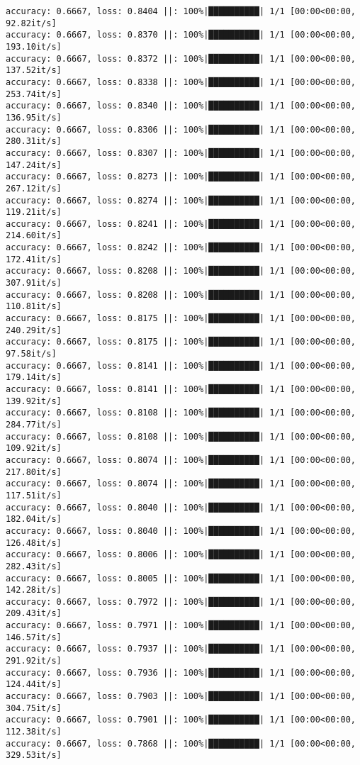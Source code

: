 \documentclass[
]{article}
\begin{document}
\begin{verbatim}
accuracy: 0.6667, loss: 0.8404 ||: 100%|██████████| 1/1 [00:00<00:00, 92.82it/s]
accuracy: 0.6667, loss: 0.8370 ||: 100%|██████████| 1/1 [00:00<00:00, 193.10it/s]
accuracy: 0.6667, loss: 0.8372 ||: 100%|██████████| 1/1 [00:00<00:00, 137.52it/s]
accuracy: 0.6667, loss: 0.8338 ||: 100%|██████████| 1/1 [00:00<00:00, 253.74it/s]
accuracy: 0.6667, loss: 0.8340 ||: 100%|██████████| 1/1 [00:00<00:00, 136.95it/s]
accuracy: 0.6667, loss: 0.8306 ||: 100%|██████████| 1/1 [00:00<00:00, 280.31it/s]
accuracy: 0.6667, loss: 0.8307 ||: 100%|██████████| 1/1 [00:00<00:00, 147.24it/s]
accuracy: 0.6667, loss: 0.8273 ||: 100%|██████████| 1/1 [00:00<00:00, 267.12it/s]
accuracy: 0.6667, loss: 0.8274 ||: 100%|██████████| 1/1 [00:00<00:00, 119.21it/s]
accuracy: 0.6667, loss: 0.8241 ||: 100%|██████████| 1/1 [00:00<00:00, 214.60it/s]
accuracy: 0.6667, loss: 0.8242 ||: 100%|██████████| 1/1 [00:00<00:00, 172.41it/s]
accuracy: 0.6667, loss: 0.8208 ||: 100%|██████████| 1/1 [00:00<00:00, 307.91it/s]
accuracy: 0.6667, loss: 0.8208 ||: 100%|██████████| 1/1 [00:00<00:00, 110.81it/s]
accuracy: 0.6667, loss: 0.8175 ||: 100%|██████████| 1/1 [00:00<00:00, 240.29it/s]
accuracy: 0.6667, loss: 0.8175 ||: 100%|██████████| 1/1 [00:00<00:00, 97.58it/s]
accuracy: 0.6667, loss: 0.8141 ||: 100%|██████████| 1/1 [00:00<00:00, 179.14it/s]
accuracy: 0.6667, loss: 0.8141 ||: 100%|██████████| 1/1 [00:00<00:00, 139.92it/s]
accuracy: 0.6667, loss: 0.8108 ||: 100%|██████████| 1/1 [00:00<00:00, 284.77it/s]
accuracy: 0.6667, loss: 0.8108 ||: 100%|██████████| 1/1 [00:00<00:00, 109.92it/s]
accuracy: 0.6667, loss: 0.8074 ||: 100%|██████████| 1/1 [00:00<00:00, 217.80it/s]
accuracy: 0.6667, loss: 0.8074 ||: 100%|██████████| 1/1 [00:00<00:00, 117.51it/s]
accuracy: 0.6667, loss: 0.8040 ||: 100%|██████████| 1/1 [00:00<00:00, 182.04it/s]
accuracy: 0.6667, loss: 0.8040 ||: 100%|██████████| 1/1 [00:00<00:00, 126.48it/s]
accuracy: 0.6667, loss: 0.8006 ||: 100%|██████████| 1/1 [00:00<00:00, 282.43it/s]
accuracy: 0.6667, loss: 0.8005 ||: 100%|██████████| 1/1 [00:00<00:00, 142.28it/s]
accuracy: 0.6667, loss: 0.7972 ||: 100%|██████████| 1/1 [00:00<00:00, 209.43it/s]
accuracy: 0.6667, loss: 0.7971 ||: 100%|██████████| 1/1 [00:00<00:00, 146.57it/s]
accuracy: 0.6667, loss: 0.7937 ||: 100%|██████████| 1/1 [00:00<00:00, 291.92it/s]
accuracy: 0.6667, loss: 0.7936 ||: 100%|██████████| 1/1 [00:00<00:00, 124.44it/s]
accuracy: 0.6667, loss: 0.7903 ||: 100%|██████████| 1/1 [00:00<00:00, 304.75it/s]
accuracy: 0.6667, loss: 0.7901 ||: 100%|██████████| 1/1 [00:00<00:00, 112.38it/s]
accuracy: 0.6667, loss: 0.7868 ||: 100%|██████████| 1/1 [00:00<00:00, 329.53it/s]

\end{verbatim}
\end{document}
